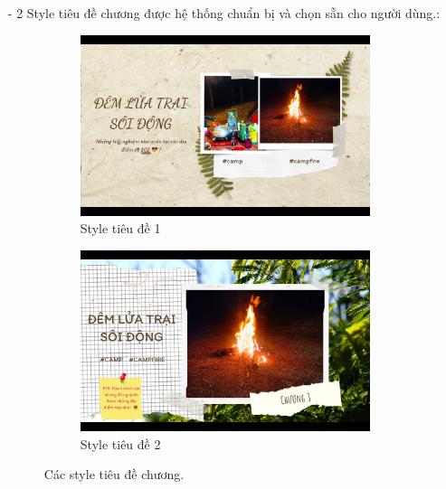 \begin{enumerate}
    \begin{itemize}
        \item[-] 2 Style tiêu đề chương được hệ thống chuẩn bị và chọn sẵn cho người dùng.:
        \begin{figure}[H]
            \centering
            \begin{subfigure}{0.48\textwidth}
                \includegraphics[width=1\linewidth]{figures/c4/4_1/title_1.jpg} 
                \caption{Style tiêu đề 1}
            \end{subfigure}
            \hfill
            \begin{subfigure}{0.48\textwidth}
                \includegraphics[width=1\linewidth]{figures/c4/4_1/title_2.jpg} 
                \caption{Style tiêu đề 2}
            \end{subfigure}
            \caption{Các style tiêu đề chương.}
            \label{fig:chapter-title-styles}
        \end{figure}
        

\end{itemize}
\end{enumerate}
